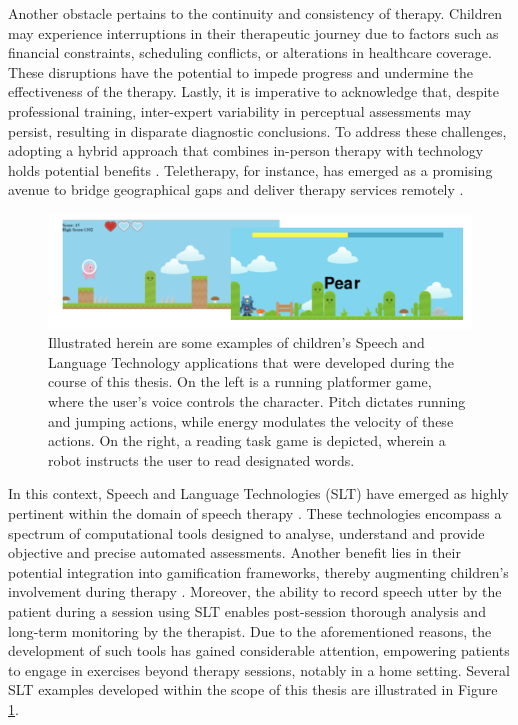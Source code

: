 Another obstacle pertains to the continuity and consistency of therapy. Children may experience interruptions in their therapeutic journey due to factors such as financial constraints, scheduling conflicts, or alterations in healthcare coverage. These disruptions have the potential to impede progress and undermine the effectiveness of the therapy. Lastly, it is imperative to acknowledge that, despite professional training, inter-expert variability in perceptual assessments may persist, resulting in disparate diagnostic conclusions. To address these challenges, adopting a hybrid approach that combines in-person therapy with technology holds potential benefits \cite{hilty2015new,barnett2011utilizing}. Teletherapy, for instance, has emerged as a promising avenue to bridge geographical gaps and deliver therapy services remotely \cite{hughes2019increasing}.

\begin{figure}
    \centering
    \includegraphics[width=1\textwidth]{imgs/exampleSLT.png}
    \caption{Illustrated herein are some examples of children's Speech and Language Technology applications that were developed during the course of this thesis. On the left is a running platformer game, where the user's voice controls the character. Pitch dictates running and jumping actions, while energy modulates the velocity of these actions. On the right, a reading task game is depicted, wherein a robot instructs the user to read designated words.}
    \label{fig:exSLT}

\end{figure}

In this context, Speech and Language Technologies (SLT) have emerged as highly pertinent within the domain of speech therapy \cite{mendoza2022added}. These technologies encompass a spectrum of computational tools designed to analyse, understand and provide objective and precise automated assessments. Another benefit lies in their potential integration into gamification frameworks, thereby augmenting children's involvement during therapy \cite{brewer2013using}. Moreover, the ability to record speech utter by the patient during a session using SLT enables post-session thorough analysis and long-term monitoring by the therapist. Due to the aforementioned reasons, the development of such tools has gained considerable attention, empowering patients to engage in exercises beyond therapy sessions, notably in a home setting. Several SLT examples developed within the scope of this thesis are illustrated in Figure \ref{fig:exSLT}.

